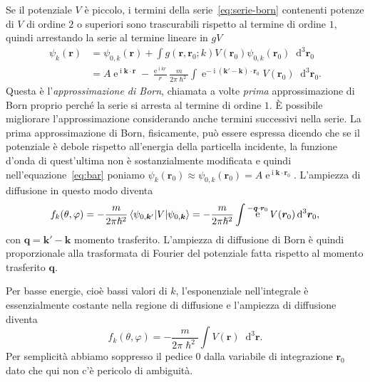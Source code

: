 \documentclass[a4paper,fleqn,twoside,12pt]{article}
\renewcommand{\phi}{\varphi}
\newcommand*{\dd}{\mathop{}\!\mathrm{d}} %
\DeclareMathOperator{\e}{\mathrm{e}} %
\DeclareMathOperator{\uimm}{\mathrm{i}} %
\begin{document}
Se il potenziale $V$ è piccolo, i termini della serie~\eqref{eq:serie-born}
contenenti potenze di $V$ di ordine $2$ o superiori sono trascurabili rispetto
al termine di ordine $1$, quindi arrestando la serie al termine lineare in $gV$
\begin{equation}
  \begin{split}
    \psi_{k}(\bm{r}) &= \psi_{0,k}(\bm{r}) + \int g(\bm{r},\bm{r}_{0};k)
    V(\bm{r}_{0}) \psi_{0,k}(\bm{r}_{0}) \dd^{3}\bm{r}_{0} \\
    &= A\e^{\uimm \bm{k}\cdot\bm{r}} - \frac{\e^{\uimm kr}}{r}
    \frac{m}{2\pi\hslash^{2}}\int \e^{-\uimm (\bm{k}' - \bm{k})\cdot\bm{r}_{0}}
    V(\bm{r}_{0}) \dd^{3} \bm{r}_{0}.
  \end{split}
\end{equation}
Questa è l'\emph{approssimazione di Born}, chiamata a volte \emph{prima}
approssimazione di Born proprio perché la serie si arresta al termine di ordine
$1$.  È possibile migliorare l'approssimazione considerando anche termini
successivi nella serie.  La prima approssimazione di Born, fisicamente, può
essere espressa dicendo che se il potenziale è debole rispetto all'energia della
particella incidente, la funzione d'onda di quest'ultima non è sostanzialmente
modificata e quindi nell'equazione~\eqref{eq:bar} poniamo
$\psi_{k}(\bm{r}_{0}) \approx \psi_{0,k}(\bm{r}_{0}) =
A\e^{\uimm \bm{k}\cdot\bm{r}_{0}}$.
L'ampiezza di diffusione in questo modo diventa
\begin{equation}
  \label{eq:ampiezza-born-braket}
  f_{k}(\theta,\phi) = -\frac{m}{2\pi\hslash^{2}} \braket{\psi_{0,\bm{k}'} | V |
    \psi_{0,\bm{k}}} = -\frac{m}{2\pi\hslash^{2}} \int \e^{-\bm{q}\cdot\bm{r}_{0}}
  V(\bm{r}_{0}) \dd^{3} \bm{r}_{0},
\end{equation}
con $\bm{q} = \bm{k}' - \bm{k}$ momento trasferito.  L'ampiezza di diffusione di
Born è quindi proporzionale alla trasformata di Fourier del potenziale fatta
rispetto al momento trasferito $\bm{q}$.

Per basse energie, cioè bassi valori di $k$, l'esponenziale nell'integrale è
essenzialmente costante nella regione di diffusione e l'ampiezza di diffusione
diventa
\begin{equation}
  f_{k}(\theta,\phi) = -\frac{m}{2\pi\hslash^{2}} \int V(\bm{r}) \dd^{3}
  \bm{r}.
\end{equation}
Per semplicità abbiamo soppresso il pedice $0$ dalla variabile di integrazione
$\bm{r}_{0}$ dato che qui non c'è pericolo di ambiguità.
\end{document}
